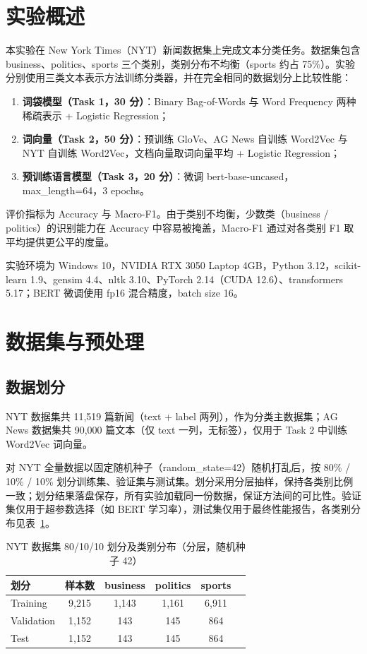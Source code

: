 \documentclass[UTF8,a4paper,10pt]{ctexart}
\begin{document}
\section{实验概述}
本实验在 New York Times（NYT）新闻数据集上完成文本分类任务。数据集包含 business、politics、sports 三个类别，类别分布不均衡（sports 约占 75\%）。实验分别使用三类文本表示方法训练分类器，并在完全相同的数据划分上比较性能：

\begin{enumerate}
  \item \textbf{词袋模型（Task 1，30 分）}：Binary Bag-of-Words 与 Word Frequency 两种稀疏表示 + Logistic Regression；
  \item \textbf{词向量（Task 2，50 分）}：预训练 GloVe、AG News 自训练 Word2Vec 与 NYT 自训练 Word2Vec，文档向量取词向量平均 + Logistic Regression；
  \item \textbf{预训练语言模型（Task 3，20 分）}：微调 bert-base-uncased，max\_length=64，3 epochs。
\end{enumerate}

评价指标为 Accuracy 与 Macro-F1。由于类别不均衡，少数类（business / politics）的识别能力在 Accuracy 中容易被掩盖，Macro-F1 通过对各类别 F1 取平均提供更公平的度量。

实验环境为 Windows 10，NVIDIA RTX 3050 Laptop 4GB，Python 3.12，scikit-learn 1.9、gensim 4.4、nltk 3.10、PyTorch 2.14（CUDA 12.6）、transformers 5.17；BERT 微调使用 fp16 混合精度，batch size 16。

\section{数据集与预处理}

\subsection{数据划分}
NYT 数据集共 11,519 篇新闻（text + label 两列），作为分类主数据集；AG News 数据集共 90,000 篇文本（仅 text 一列，无标签），仅用于 Task 2 中训练 Word2Vec 词向量。

对 NYT 全量数据以固定随机种子（random\_state=42）随机打乱后，按 80\% / 10\% / 10\% 划分训练集、验证集与测试集。划分采用分层抽样，保持各类别比例一致；划分结果落盘保存，所有实验加载同一份数据，保证方法间的可比性。验证集仅用于超参数选择（如 BERT 学习率），测试集仅用于最终性能报告，各类别分布见表~\ref{tab:split}。

\begin{table}[!htbp]
  \centering
  \begin{tabular}{lccccc}
  \toprule
  划分 & 样本数 & business & politics & sports \\
  \midrule
  Training   & 9,215 & 1,143 & 1,161 & 6,911 \\
  Validation & 1,152 &   143 &   145 &   864 \\
  Test       & 1,152 &   143 &   145 &   864 \\
  \bottomrule
  \end{tabular}
  \caption{NYT 数据集 80/10/10 划分及类别分布（分层，随机种子 42）}
  \label{tab:split}
\end{table}
\end{document}

